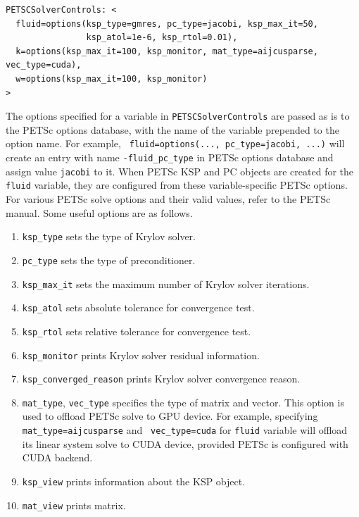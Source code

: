 \documentclass{article}
\begin{document}
\begin{enumerate}
\begin{verbatim}
PETSCSolverControls: <
  fluid=options(ksp_type=gmres, pc_type=jacobi, ksp_max_it=50,
                ksp_atol=1e-6, ksp_rtol=0.01),
  k=options(ksp_max_it=100, ksp_monitor, mat_type=aijcusparse, vec_type=cuda),
  w=options(ksp_max_it=100, ksp_monitor)
>
\end{verbatim}
The options specified for a variable in {\tt PETSCSolverControls} are
passed as is to the PETSc options database, with the name of the
variable prepended to the option name. For example, {\tt
 fluid=options(..., pc\_type=jacobi, ...)} will create an entry with
name {\tt -fluid\_pc\_type} in PETSc options database and assign value
{\tt jacobi} to it. When PETSc KSP and PC objects are created for the
{\tt fluid} variable, they are configured from these variable-specific
PETSc options.  For various PETSc solve options and their valid
values, refer to the PETSc manual. Some useful options are as follows.
\begin{enumerate}
\item {\tt ksp\_type} sets the type of Krylov solver.
\item {\tt pc\_type} sets the type of preconditioner.
\item {\tt ksp\_max\_it} sets the maximum number of Krylov solver
  iterations.
\item {\tt ksp\_atol} sets absolute tolerance for convergence test.
\item {\tt ksp\_rtol} sets relative tolerance for convergence test.
\item {\tt ksp\_monitor} prints Krylov solver residual information.
\item {\tt ksp\_converged\_reason} prints Krylov solver convergence
  reason.
\item {\tt mat\_type}, {\tt vec\_type} specifies the type of matrix
  and vector. This option is used to offload PETSc solve to GPU
  device. For example, specifying {\tt mat\_type=aijcusparse} and {\tt
    vec\_type=cuda} for {\tt fluid} variable will offload its linear
  system solve to CUDA device, provided PETSc is configured with CUDA
  backend.
\item {\tt ksp\_view} prints information about the KSP object.
\item {\tt mat\_view} prints matrix.
\end{enumerate}


\end{enumerate}
\end{document}
